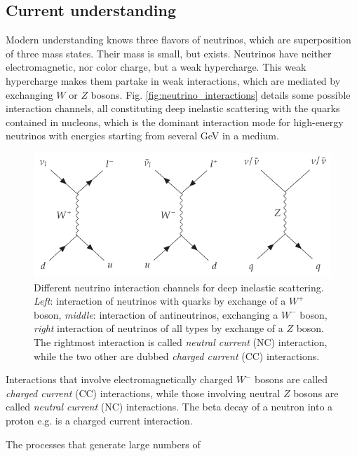\documentclass[
    a4paper, %
    fontsize=10pt, %
    twoside=false, %
    numbers=noenddot, %
    fontmethod=tex,
]{kaobook}
\begin{document}
\subsection{Current understanding} \label{neutrinos_current}
Modern understanding knows three flavors of neutrinos, which are superposition of three mass states. Their mass is small, but exists. Neutrinos have neither electromagnetic, nor color charge, but a weak hypercharge. This weak hypercharge makes them partake in weak interactions, which are mediated by exchanging $W$ or $Z$ bosons. Fig. \ref{fig:neutrino_interactions} details some possible interaction channels, all constituting deep inelastic scattering with the quarks contained in nucleons, which is the dominant interaction mode for high-energy neutrinos with energies starting from several \unit{\giga\eV} in a medium.

\begin{figure}[htb]
    \includegraphics{theory/neutrino_interactions_feynman.pdf}
    \caption[Neutrino interactions]{Different neutrino interaction channels for deep inelastic scattering. \textit{Left}: interaction of neutrinos with quarks by exchange of a $W^+$ boson, \textit{middle}: interaction of antineutrinos, exchanging a $W^-$ boson, \textit{right} interaction of neutrinos of all types by exchange of a $Z$ boson. The rightmost interaction is called \textit{neutral current} (NC) interaction, while the two other are dubbed \textit{charged current} (CC) interactions.} 
\end{figure}

Interactions that involve electromagnetically charged $W^-$ bosons are called \textit{charged current} (CC) interactions, while those involving neutral $Z$ bosons are called \textit{neutral current} (NC) interactions. The beta decay of a neutron into a proton e.g. is a charged current interaction.

The processes that generate large numbers of 
\end{document}
